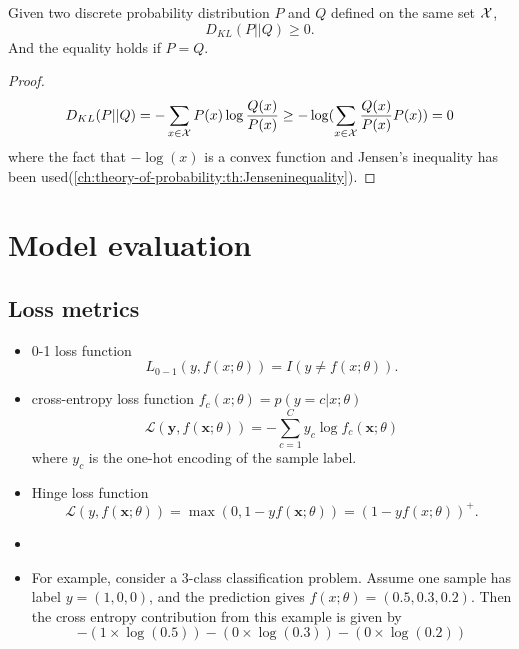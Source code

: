 \begin{refsection}
\begin{lemma}\label{ch:statistical-learning:th:KLDivergenceProperty}
	Given two discrete probability distribution $P$ and $Q$ defined on the same set $\mathcal{X}$,
	$$D_{KL}(P||Q)\geq 0.$$
	And the equality holds if $P=Q$.
\end{lemma}
\begin{proof}
	$$D_{KL}(P||Q) = -\sum_{x\in\mathcal{X}} P(x)\log \frac{Q(x)}{P(x)}\geq - \log (\sum_{x\in\mathcal{X}} \frac{Q(x)}{P(x)} P(x)) = 0$$
	where the fact that $-\log(x)$ is a convex function and Jensen's inequality has been used(\autoref{ch:theory-of-probability:th:Jenseninequality}).
\end{proof}




\section{Model evaluation}
\subsection{Loss metrics}

\begin{definition}\cite[28]{Qiu2019NeuralLearning}
	\begin{itemize}
		\item 0-1 loss function
		$$L_{0-1}(y, f(x;\theta)) = I(y \neq f(x;\theta)).$$
		\item cross-entropy loss function
		$f_c(x;\theta) = p(y = c|x;\theta)$
		$$\mathcal{L}(\boldsymbol{y}, f(\boldsymbol{x} ; \theta))=-\sum_{c=1}^{C} y_{c} \log f_{c}(\boldsymbol{x} ; \theta)$$
		where $y_c$ is the one-hot encoding of the sample label.
		\item Hinge loss function
		$$\mathcal{L}(y, f(\boldsymbol{x} ; \theta))=\max (0,1-y f(\boldsymbol{x} ; \theta)) = (1 - yf(x;\theta))^+.$$
		
	\end{itemize}
\end{definition}

\begin{example}\hfill
\begin{itemize}
	\item 
	\item For example, consider a 3-class classification problem. Assume one sample has label $y = (1, 0, 0)$, and the prediction gives $f(x;\theta) = (0.5, 0.3, 0.2)$. Then the cross entropy contribution from this example is given by
	$$-(1\times \log (0.5)) - (0 \times \log(0.3)) - (0 \times \log(0.2))$$
	

\end{itemize}
\end{example}
\end{refsection}
